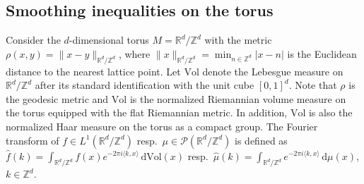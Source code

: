 \documentclass[11pt,a4paper]{article}
\theoremstyle{definition}
\begin{document}
\subsection{Smoothing inequalities on the torus}\label{torussection}

Consider the $d$-dimensional torus $M=\mathbb{R}^d / \mathbb{Z}^d$ with the metric $\rho (x,y) = \| x-y \|_{\mathbb{R}^d / \mathbb{Z}^d}$, where $\| x \|_{\mathbb{R}^d / \mathbb{Z}^d} = \min_{n \in \mathbb{Z}^d} |x-n|$ is the Euclidean distance to the nearest lattice point. Let $\mathrm{Vol}$ denote the Lebesgue measure on $\mathbb{R}^d / \mathbb{Z}^d$ after its standard identification with the unit cube $[0,1]^d$. Note that $\rho$ is the geodesic metric and $\mathrm{Vol}$ is the normalized Riemannian volume measure on the torus equipped with the flat Riemannian metric. In addition, $\mathrm{Vol}$ is also the normalized Haar measure on the torus as a compact group. The Fourier transform of $f \in L^1 (\mathbb{R}^d / \mathbb{Z}^d)$ resp.\ $\mu \in \mathcal{P}(\mathbb{R}^d / \mathbb{Z}^d)$ is defined as $\widehat{f}(k)=\int_{\mathbb{R}^d / \mathbb{Z}^d} f(x) e^{-2 \pi i \langle k,x \rangle} \, \mathrm{d}\mathrm{Vol}(x)$ resp.\ $\widehat{\mu}(k)=\int_{\mathbb{R}^d / \mathbb{Z}^d} e^{- 2 \pi i \langle k,x \rangle} \, \mathrm{d} \mu(x)$, $k \in \mathbb{Z}^d$.
\end{document}
